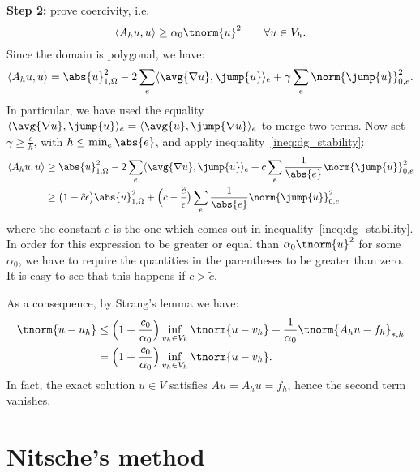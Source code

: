 \textbf{Step 2:} prove coercivity, i.e.
\[
\langle A_h u, u \rangle \ge \alpha_0 \tnorm{u}^2 \qquad \forall u \in V_h.
\]
Since the domain is polygonal, we have:
\[
    \langle A_h u, u \rangle =
    \abs{u}_{1,\Omega}^2 -
    2 \sum_e \langle \avg{\nabla u}, \jump{u} \rangle_{e} +
    \gamma \sum_e \norm{\jump{u}}_{0,e}^2.
\]
In particular, we have used the equality $\langle \avg{\nabla u}, \jump{u} \rangle_{e} = \langle \avg{u}, \jump{\nabla u} \rangle_{e}$ to merge two terms. Now set $\gamma \ge \frac{c}{h}$, with $h \le \min_e \abs{e}$, and apply inequality~\eqref{ineq:dg_stability}:
\begin{align}
    \langle A_h u, u \rangle & \ge
    \abs{u}_{1,\Omega}^2 -
    2 \sum_e \langle \avg{\nabla u}, \jump{u} \rangle_{e} +
    c \sum_e \frac{1}{\abs{e}} \norm{\jump{u}}_{0,e}^2 \\
    & \ge \bigl(1-\tilde{c}\epsilon\bigr) \abs{u}_{1,\Omega}^2 +
    \Bigl(c-\frac{\tilde{c}}{\epsilon}\bigr) \sum_e \frac{1}{\abs{e}} \norm{\jump{u}}_{0,e}^2
\end{align}
where the constant $\tilde{c}$ is the one which comes out in inequality~\eqref{ineq:dg_stability}. In order for this expression to be greater or equal than $\alpha_0 \tnorm{u}^2$ for some $\alpha_0$, we have to require the quantities in the parentheses to be greater than zero. It is easy to see that this happens if $c>\tilde{c}$.


As a consequence, by Strang's lemma we have:
\begin{align}
    \tnorm{u-u_h} &\le \Bigl(1 + \frac{c_0}{\alpha_0} \Bigr) \inf_{v_h \in V_h} \tnorm{u-v_h} + \frac{1}{\alpha_0} \tnorm{A_h u - f_h}_{*,h} \\
    & = \Bigl(1 + \frac{c_0}{\alpha_0} \Bigr) \inf_{v_h \in V_h} \tnorm{u-v_h}.
\end{align}
In fact, the exact solution $u \in V$ satisfies $A u = A_h u = f_h$, hence the second term vanishes.


\section{Nitsche's method}


